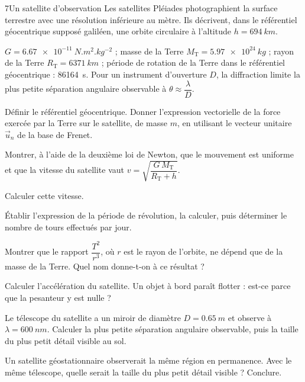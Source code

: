 \begin{exoBac}{7}{Un satellite d'observation}
Les satellites Pléiades photographient la surface terrestre avec une résolution inférieure au mètre. Ils décrivent, dans
le référentiel géocentrique supposé galiléen, une orbite circulaire à l'altitude $h=\qty{694}{km}$.
\begin{donnees}
$G=\qty{6,67e-11}{N.m^2.kg^{-2}}$ ; masse de la Terre $M_\mathrm{T}=\qty{5,97e24}{kg}$ ; rayon de la Terre $R_\mathrm{T}=\qty{6371}{km}$ ; période de rotation
de la Terre dans le référentiel géocentrique : \qty{86164}{s}. Pour un instrument d'ouverture $D$, la diffraction limite la
plus petite séparation angulaire observable à $\theta\approx\dfrac{\lambda}{D}$.
\end{donnees}
\begin{questions}
\item Définir le référentiel géocentrique. Donner l'expression vectorielle de la force exercée par la Terre sur le satellite,
de masse $m$, en utilisant le vecteur unitaire $\vec u_n$ de la base de Frenet.
\item Montrer, à l'aide de la deuxième loi de Newton, que le mouvement est uniforme et que la vitesse du satellite vaut
$v=\sqrt{\dfrac{G\,M_\mathrm{T}}{R_\mathrm{T}+h}}$.
\item Calculer cette vitesse.
\item Établir l'expression de la période de révolution, la calculer, puis déterminer le nombre de tours effectués par jour.
\item Montrer que le rapport $\dfrac{T^2}{r^3}$, où $r$ est le rayon de l'orbite, ne dépend que de la masse de la Terre. Quel nom donne-t-on
à ce résultat ?
\item Calculer l'accélération du satellite. Un objet à bord paraît flotter : est-ce parce que la pesanteur y est nulle ?
\item Le télescope du satellite a un miroir de diamètre $D=\qty{0,65}{m}$ et observe à $\lambda=\qty{600}{nm}$. Calculer la plus petite
séparation angulaire observable, puis la taille du plus petit détail visible au sol.
\item \initiative Un satellite géostationnaire observerait la même région en permanence. Avec le même télescope, quelle
serait la taille du plus petit détail visible ? Conclure.
\end{questions}
\end{exoBac}

